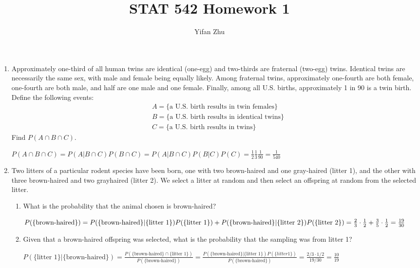 \documentclass[letter]{article}
\begin{document}
	
	\title{STAT 542 Homework 1}
	\author{Yifan Zhu}
	\maketitle
	
	\begin{enumerate}[leftmargin = 0 em, label = \arabic*., font = \bfseries]
	\item Approximately one-third of all human twins are identical (one-egg) and two-thirds are fraternal (two-egg) twins. Identical twins are necessarily the same sex, with male and female being equally likely. Among fraternal twins, approximately one-fourth are both female, one-fourth are both male, and half are one male and one female. Finally, among all U.S. births, approximately 1 in 90 is a twin birth. Define the following events:
	\begin{align*}
	&A = \{\textrm{a U.S. birth results in twin females}\}\\
	&B = \{\textrm{a U.S. birth results in identical twins}\}\\
	&C = \{\textrm{a U.S. birth results in twins}\}
	\end{align*}
	Find $P(A \cap B \cap C)$.

	$P(A\cap B \cap C) = P(A| B \cap C)P(B \cap C) = P(A | B \cap C)P(B | C) P(C) = \frac{1}{2} \frac{1}{3} \frac{1}{90} = \frac{1}{540}$

	\item Two litters of a particular rodent species have been born, one with two brown-haired and one gray-haired (litter 1), and the other with three brown-haired and two grayhaired (litter 2). We select a litter at random and then select an offspring at random from the selected litter.
	\begin{enumerate}[label = (\alph*), leftmargin = 0em]
		\item What is the probability that the animal chosen is brown-haired?

		$P(\{\textrm{brown-haired}\}) = P(\{\textrm{brown-haired}\} | \{\textrm{litter 1}\}) P(\{\textrm{litter 1}\}) 
		+\\ P(\{\textrm{brown-haired}\}| \{\textrm{litter 2}\}) P(\{\textrm{litter 2}\}) = \frac{2}{3} \cdot \frac{1}{2} + \frac{3}{5}\cdot \frac{1}{2} = \frac{19}{30}$
		\item Given that a brown-haired offspring was selected, what is the probability that the sampling was from litter 1?

		$P(\{\textrm{litter 1}\} | \{ \textrm{brown-haired}\}) = \frac{P(\{\textrm{brown-haired}\}\cap \{\textrm{litter 1}\})}{P(\{\textrm{brown-haired}\})} = \frac{P(\{\textrm{brown-haired}\}|\{\textrm{litter 1}\}) P(\{litter 1\})}{P(\{\textrm{brown-haired}\})} = \frac{2/3 \cdot 1/2}{19/30} = \frac{10}{19}$
	\end{enumerate}
	

\end{enumerate}
\end{document}
